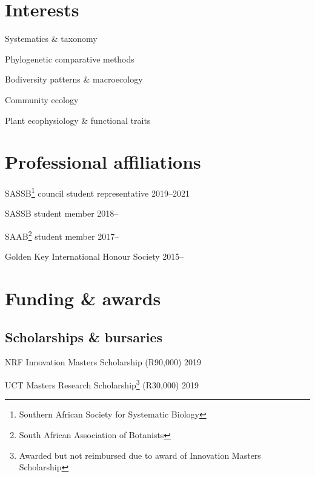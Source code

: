 \documentclass[10pt]{article}
\begin{document}
\begin{multicols}{2}

\section*{Interests} %
    
Systematics \& taxonomy

Phylogenetic comparative methods

Bodiversity patterns \& macroecology

Community ecology

Plant ecophysiology \& functional traits

\section*{Professional affiliations} %

SASSB\footnote{Southern African Society for Systematic Biology}
council student representative                                 \hfill 2019--2021

SASSB student member                                               \hfill 2018--

SAAB\footnote{South African Association of Botanists}
student member                                                     \hfill 2017--

Golden Key International Honour Society                            \hfill 2015--

\end{multicols}

\vfill

\clearpage %

\section*{Funding \& awards} %

\subsection*{Scholarships \& bursaries}

NRF Innovation Masters Scholarship (R90,000)                         \hfill 2019

UCT Masters Research Scholarship\footnote{Awarded but not reimbursed
  due to award of Innovation Masters Scholarship} (R30,000)          \hfill 2019
\end{document}
